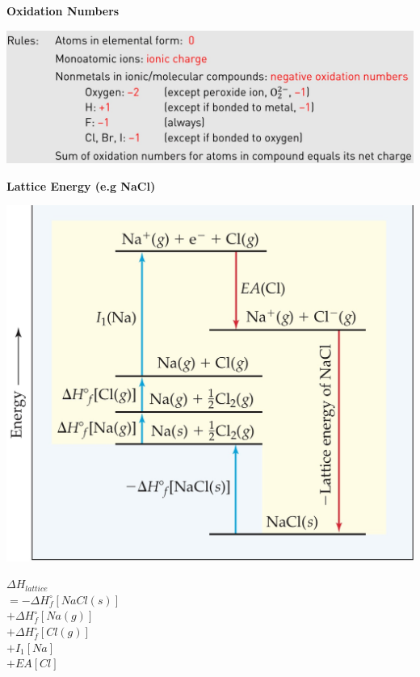 \textbf{Oxidation Numbers}\\
\begin{center}
  \includegraphics[width = 0.95\linewidth]{images/Oxidations_Numbers.jpeg} 
\end{center}
\textbf{Lattice Energy (e.g NaCl)}\\
\begin{minipage}{0.6\linewidth}
\begin{center}
   \includegraphics[width = 0.8\linewidth]{images/Lattice_Energy_NaCl.jpeg}     
\end{center}

\end{minipage}
\begin{minipage}{0.39\linewidth}
\begin{center}
    {\normalsize $\Delta H_{lattice}$ \\
    $= - \Delta H_f^{\circ}[NaCl(s)]$ \\
    $+ \Delta H_f^{\circ}[Na(g)]$\\
    $+ \Delta H_f^{\circ}[Cl(g)]$\\
    $+ I_1[Na]$\\
    $+ EA[Cl]$}
\end{center}
   
\end{minipage}

